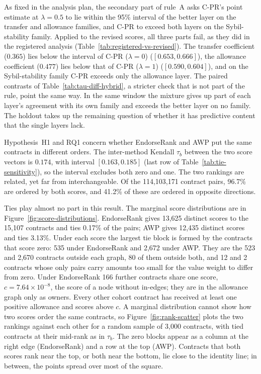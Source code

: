 As fixed in the analysis plan, the secondary part of rule~A asks C-PR's point estimate at $\lambda=0.5$ to lie within the 95\% interval of the better layer on the transfer and allowance families, and C-PR to exceed both layers on the Sybil-stability family. Applied to the revised scores, all three parts fail, as they did in the registered analysis (Table~\ref{tab:registered-vs-revised}). The transfer coefficient ($0.365$) lies below the interval of C-PR ($\lambda=0$) ($[0.653,0.666]$), the allowance coefficient ($0.477$) lies below that of C-PR ($\lambda=1$) ($[0.590,0.604]$), and on the Sybil-stability family C-PR exceeds only the allowance layer. The paired contrasts of Table~\ref{tab:tau-diff-hybrid}, a stricter check that is not part of the rule, point the same way. In the same window the mixture gives up part of each layer's agreement with its own family and exceeds the better layer on no family. The holdout takes up the remaining question of whether it has predictive content that the single layers lack.


Hypothesis~H1 and RQ1 concern whether EndorseRank and AWP put the same contracts in different orders. The inter-method Kendall $\tau_b$ between the two score vectors is $0.174$, with interval $[0.163,0.185]$ (last row of Table~\ref{tab:tie-sensitivity}), so the interval excludes both zero and one. The two rankings are related, yet far from interchangeable. Of the 114,103,171 contract pairs, 96.7\% are ordered by both scores, and 41.2\% of these are ordered in opposite directions.

Ties play almost no part in this result. The marginal score distributions are in Figure~\ref{fig:score-distributions}. EndorseRank gives 13,625 distinct scores to the 15,107 contracts and ties 0.17\% of the pairs; AWP gives 12,435 distinct scores and ties 3.13\%. Under each score the largest tie block is formed by the contracts that score zero: 535 under EndorseRank and 2,672 under AWP. They are the 523 and 2,670 contracts outside each graph, 80 of them outside both, and 12 and 2 contracts whose only pairs carry amounts too small for the value weight to differ from zero. Under EndorseRank 166 further contracts share one score, $c=7.64\times10^{-8}$, the score of a node without in-edges; they are in the allowance graph only as owners. Every other cohort contract has received at least one positive allowance and scores above $c$. A marginal distribution cannot show how two scores order the same contracts, so Figure~\ref{fig:rank-scatter} plots the two rankings against each other for a random sample of 3,000 contracts, with tied contracts at their mid-rank as in $\tau_b$. The zero blocks appear as a column at the right edge (EndorseRank) and a row at the top (AWP). Contracts that both scores rank near the top, or both near the bottom, lie close to the identity line; in between, the points spread over most of the square.

